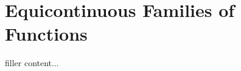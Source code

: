 \documentclass[../../templates/section]{subfiles}
\begin{document}
\section{Equicontinuous Families of Functions}\label{sec:equicontinuous-families-of-functions}

filler content...
\end{document}
